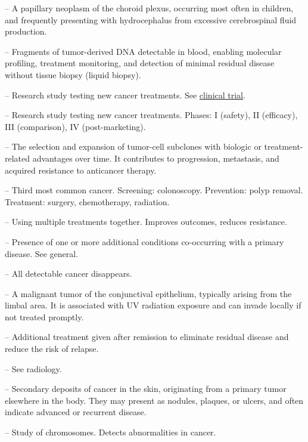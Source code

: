 -- A papillary neoplasm of the choroid plexus, occurring most often in children, and frequently presenting with hydrocephalus from excessive cerebrospinal fluid production.

-- Fragments of tumor-derived DNA detectable in blood, enabling molecular profiling, treatment monitoring, and detection of minimal residual disease without tissue biopsy (liquid biopsy).

-- Research study testing new cancer treatments. See \hyperlink{Clinical Trial}{clinical trial}.

-- Research study testing new cancer treatments. Phases: I (safety), II (efficacy), III (comparison), IV (post-marketing).


-- The selection and expansion of tumor-cell subclones with biologic or treatment-related advantages over time. It contributes to progression, metastasis, and acquired resistance to anticancer therapy.

-- Third most common cancer. Screening: colonoscopy. Prevention: polyp removal. Treatment: surgery, chemotherapy, radiation.

-- Using multiple treatments together. Improves outcomes, reduces resistance.

-- Presence of one or more additional conditions co-occurring with a primary disease. See general.

-- All detectable cancer disappears.

-- A malignant tumor of the conjunctival epithelium, typically arising from the limbal area. It is associated with UV radiation exposure and can invade locally if not treated promptly.


-- Additional treatment given after remission to eliminate residual disease and reduce the risk of relapse.

-- See radiology.

-- Secondary deposits of cancer in the skin, originating from a primary tumor elsewhere in the body. They may present as nodules, plaques, or ulcers, and often indicate advanced or recurrent disease.

-- Study of chromosomes. Detects abnormalities in cancer.


